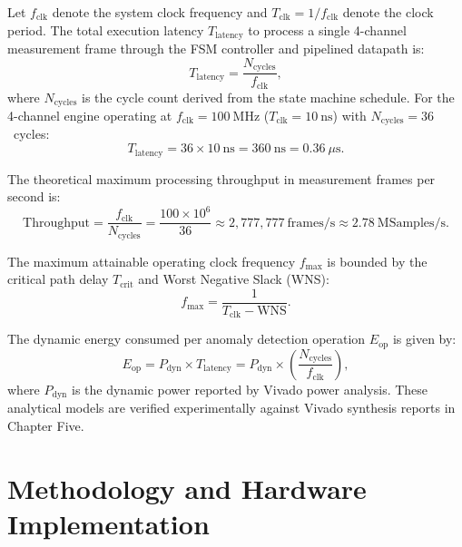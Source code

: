\documentclass[12pt,a4paper]{report}
\begin{document}
Let $f_{\text{clk}}$ denote the system clock frequency and $T_{\text{clk}} = 1/f_{\text{clk}}$
denote the clock period. The total execution latency $T_{\text{latency}}$ to process a single
4-channel measurement frame through the FSM controller and pipelined datapath is:
\begin{equation}
T_{\text{latency}} = \frac{N_{\text{cycles}}}{f_{\text{clk}}},
\label{eq:ch3_latency_model}
\end{equation}
where $N_{\text{cycles}}$ is the cycle count derived from the state machine schedule.
For the 4-channel engine operating at $f_{\text{clk}} = 100~\text{MHz}$ ($T_{\text{clk}} = 10~\text{ns}$)
with $N_{\text{cycles}} = 36$~cycles:
\begin{equation}
T_{\text{latency}} = 36 \times 10~\text{ns} = 360~\text{ns} = 0.36~\mu\text{s}.
\end{equation}

The theoretical maximum processing throughput in measurement frames per second is:
\begin{equation}
\text{Throughput} = \frac{f_{\text{clk}}}{N_{\text{cycles}}} = \frac{100 \times 10^6}{36} \approx 2,777,777~\text{frames/s} \approx 2.78~\text{MSamples/s}.
\label{eq:ch3_throughput_model}
\end{equation}

The maximum attainable operating clock frequency $f_{\max}$ is bounded by the critical
path delay $T_{\text{crit}}$ and Worst Negative Slack (WNS):
\begin{equation}
f_{\max} = \frac{1}{T_{\text{clk}} - \text{WNS}}.
\label{eq:ch3_fmax_model}
\end{equation}

The dynamic energy consumed per anomaly detection operation $E_{\text{op}}$ is given by:
\begin{equation}
E_{\text{op}} = P_{\text{dyn}} \times T_{\text{latency}} = P_{\text{dyn}} \times \left( \frac{N_{\text{cycles}}}{f_{\text{clk}}} \right),
\label{eq:ch3_energy_model}
\end{equation}
where $P_{\text{dyn}}$ is the dynamic power reported by Vivado power analysis. These analytical
models are verified experimentally against Vivado synthesis reports in Chapter Five.


\chapter{Methodology and Hardware Implementation}
\end{document}
